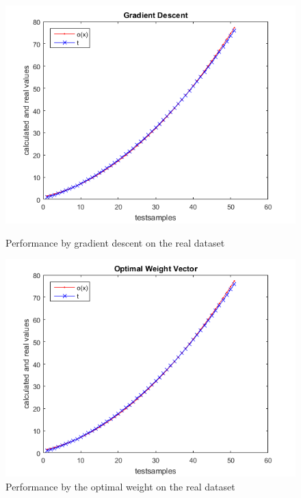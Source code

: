 \begin{figure}[!ht]
	
	\begin{minipage}{0.5 \textwidth}
		\centering
		\includegraphics[width=1\textwidth]{img/gradientDescent}
		\caption{Performance by gradient descent on the real dataset}
		\label{fig:perGraDescent}
	\end{minipage}
	\begin{minipage}{0.5 \textwidth}
		\centering
		\includegraphics[width=1\textwidth]{img/optimalWeightVector}
		\caption{Performance by the optimal weight on the real dataset}
		\label{fig:perOptimal}
	\end{minipage}
\end{figure}




